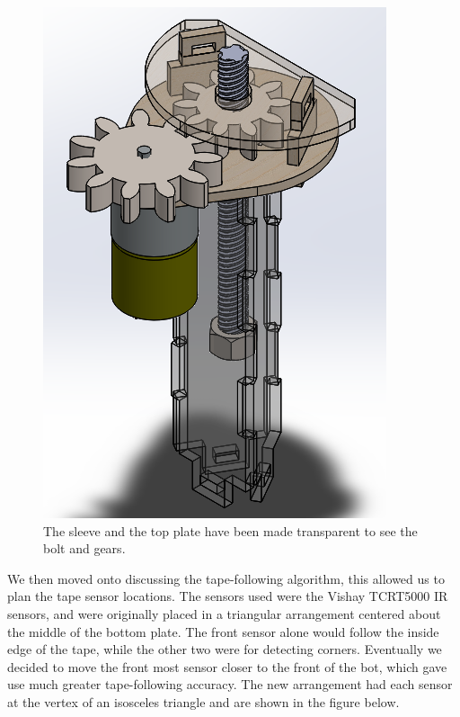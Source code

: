 \documentclass[]{article}
\begin{document}
\begin{figure}[H]
    \centering
    \includegraphics[scale=0.50]{lift-CAD.PNG}
    \caption{The sleeve and the top plate have been made transparent to see the bolt and gears.}
    \label{lift cad}
\end{figure}


We then moved onto discussing the tape-following algorithm, this allowed us to plan the tape sensor locations. The sensors used were the Vishay TCRT5000 IR sensors, and were originally placed in a triangular arrangement centered about the middle of the bottom plate. The front sensor alone would follow the inside edge of the tape, while the other two were for detecting corners. Eventually we decided to move the front most sensor closer to the front of the bot, which gave use much greater tape-following accuracy. The new arrangement had each sensor at the vertex of an isosceles triangle and are shown in the figure below.
\end{document}
